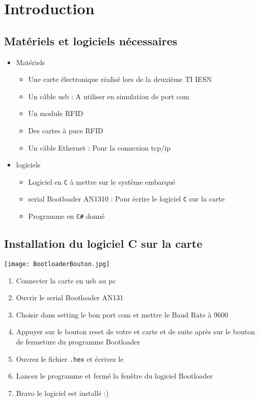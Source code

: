 \documentclass[12pt,a4paper]{report}
\begin{document}
\chapter{Introduction}
	\section{Matériels et logiciels nécessaires}
	\renewcommand {\labelitemii }{$\diamond $}	
		\begin{itemize}
			\item Matériels			
			\begin{itemize}
				\item Une carte électronique réalisé lors de la deuxième TI IESN		
				\item Un câble usb : A utiliser en simulation de port com		
				\item Un module RFID
				\item Des cartes à puce RFID
				\item Un câble Ethernet : Pour la connexion tcp/ip
			\end{itemize}
			\item logiciels
			\begin{itemize}
				\item Logiciel en \verb+C+ à mettre sur le système embarqué
				\item serial Bootloader AN1310 : Pour écrire le logiciel \verb+C+ sur la carte
				\item Programme en \verb+C#+ donné
			\end{itemize}
		\end{itemize}
	\section{Installation du logiciel C sur la carte}
	\texttt{[image: BootloaderBouton.jpg]}
		\begin{enumerate}
			\item Connecter la carte en usb au pc
			\item Ouvrir le serial Bootloader AN131
			\item Choisir dans setting le bon port com et mettre le Baud Rate à 9600
			\item Appuyer sur le bouton reset de votre et carte et de suite après sur le bouton de fermeture du programme Bootloader
			\item Ouvrez le fichier \verb+.hex+ et écrivez le
			\item Lancez le programme et fermé la fenêtre du logiciel Bootloader
			\item Bravo le logiciel est installé :)
		\end{enumerate}
\end{document}
